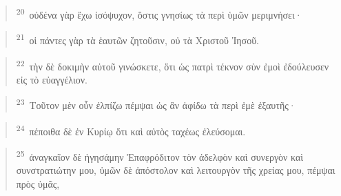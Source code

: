 \documentclass{article}
\newcommand{\currentverse}{1} %
\newcommand{\setcurrentverse}[1]{\renewcommand{\currentverse}{#1}}
\begin{document}
\begin{verse}

\setcurrentverse{20}

\setcounter{footnote}{0}

\textsuperscript{20}~οὐδένα γὰρ ἔχω ἰσόψυχον, ὅστις γνησίως τὰ περὶ ὑμῶν μεριμνήσει·

\end{verse}

\begin{verse}

\setcurrentverse{21}

\setcounter{footnote}{0}

\textsuperscript{21}~οἱ πάντες γὰρ τὰ ἑαυτῶν ζητοῦσιν, οὐ τὰ Χριστοῦ Ἰησοῦ.

\end{verse}

\begin{verse}

\setcurrentverse{22}

\setcounter{footnote}{0}

\textsuperscript{22}~τὴν δὲ δοκιμὴν αὐτοῦ γινώσκετε, ὅτι ὡς πατρὶ τέκνον σὺν ἐμοὶ ἐδούλευσεν εἰς τὸ εὐαγγέλιον.

\end{verse}

\begin{verse}

\setcurrentverse{23}

\setcounter{footnote}{0}

\textsuperscript{23}~Τοῦτον μὲν οὖν ἐλπίζω πέμψαι ὡς ἂν ἀφίδω τὰ περὶ ἐμὲ ἐξαυτῆς·

\end{verse}

\begin{verse}

\setcurrentverse{24}

\setcounter{footnote}{0}

\textsuperscript{24}~πέποιθα δὲ ἐν Κυρίῳ ὅτι καὶ αὐτὸς ταχέως ἐλεύσομαι.

\end{verse}

\begin{verse}

\setcurrentverse{25}

\setcounter{footnote}{0}

\textsuperscript{25}~ἀναγκαῖον δὲ ἡγησάμην Ἐπαφρόδιτον τὸν ἀδελφὸν καὶ συνεργὸν καὶ συνστρατιώτην μου, ὑμῶν δὲ ἀπόστολον καὶ λειτουργὸν τῆς χρείας μου, πέμψαι πρὸς ὑμᾶς,

\end{verse}
\end{document}
